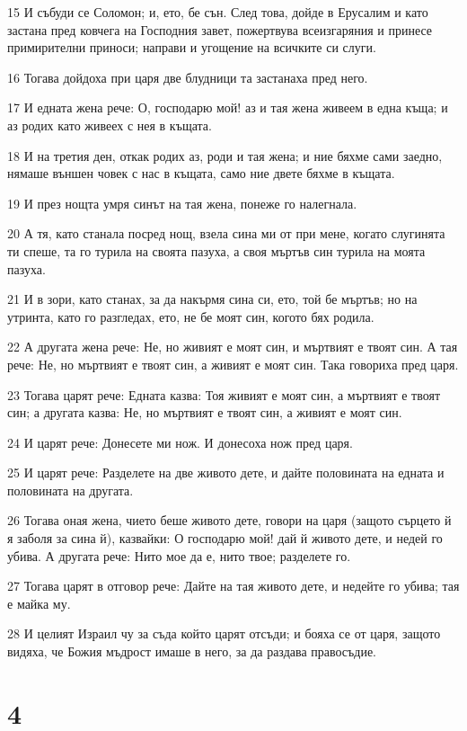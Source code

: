 \par 15 И събуди се Соломон; и, ето, бе сън. След това, дойде в Ерусалим и като застана пред ковчега на Господния завет, пожертвува всеизгаряния и принесе примирителни приноси; направи и угощение на всичките си слуги.
\par 16 Тогава дойдоха при царя две блудници та застанаха пред него.
\par 17 И едната жена рече: О, господарю мой! аз и тая жена живеем в една къща; и аз родих като живеех с нея в къщата.
\par 18 И на третия ден, откак родих аз, роди и тая жена; и ние бяхме сами заедно, нямаше външен човек с нас в къщата, само ние двете бяхме в къщата.
\par 19 И през нощта умря синът на тая жена, понеже го налегнала.
\par 20 А тя, като станала посред нощ, взела сина ми от при мене, когато слугинята ти спеше, та го турила на своята пазуха, а своя мъртъв син турила на моята пазуха.
\par 21 И в зори, като станах, за да накърмя сина си, ето, той бе мъртъв; но на утринта, като го разгледах, ето, не бе моят син, когото бях родила.
\par 22 А другата жена рече: Не, но живият е моят син, и мъртвият е твоят син. А тая рече: Не, но мъртвият е твоят син, а живият е моят син. Така говориха пред царя.
\par 23 Тогава царят рече: Едната казва: Тоя живият е моят син, а мъртвият е твоят син; а другата казва: Не, но мъртвият е твоят син, а живият е моят син.
\par 24 И царят рече: Донесете ми нож. И донесоха нож пред царя.
\par 25 И царят рече: Разделете на две живото дете, и дайте половината на едната и половината на другата.
\par 26 Тогава оная жена, чието беше живото дете, говори на царя (защото сърцето й я заболя за сина й), казвайки: О господарю мой! дай й живото дете, и недей го убива. А другата рече: Нито мое да е, нито твое; разделете го.
\par 27 Тогава царят в отговор рече: Дайте на тая живото дете, и недейте го убива; тая е майка му.
\par 28 И целият Израил чу за съда който царят отсъди; и бояха се от царя, защото видяха, че Божия мъдрост имаше в него, за да раздава правосъдие.

\chapter{4}

